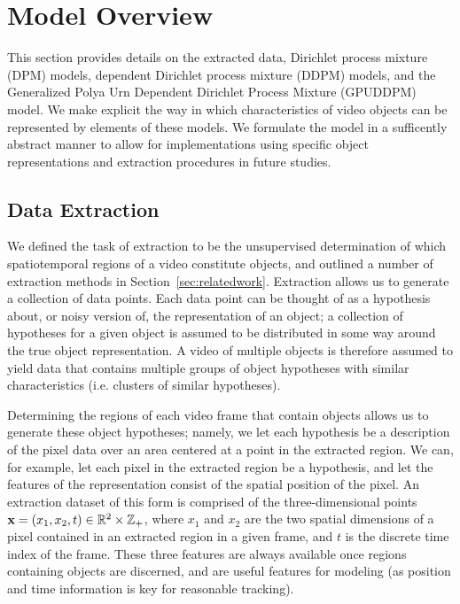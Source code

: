 \documentclass[smallcondensed, final]{svjour3}
\begin{document}

\section{Model Overview}
\label{sec:modeloverview}

This section provides details on the extracted data, Dirichlet process mixture (DPM) models, dependent Dirichlet process mixture (DDPM) models, and the Generalized Polya Urn Dependent Dirichlet Process Mixture (GPUDDPM) model. We make explicit the way in which characteristics of video objects can be represented by elements of these models. We formulate the model in a sufficently abstract manner to allow for implementations using specific object representations and extraction procedures in future studies.






\subsection{Data Extraction}
\label{sec:data}

We defined the task of extraction to be the unsupervised determination of which spatiotemporal regions of a video constitute objects, and outlined a number of extraction methods in Section~\ref{sec:relatedwork}. Extraction allows us to generate a collection of data points. Each data point can be thought of as a hypothesis about, or noisy version of, the representation of an object; a collection of hypotheses for a given object is assumed to be distributed in some way around the true object representation. A video of multiple objects is therefore assumed to yield data that contains multiple groups of object hypotheses with similar characteristics (i.e. clusters of similar hypotheses).

Determining the regions of each video frame that contain objects allows us to generate these object hypotheses; namely, we let each hypothesis be a description of the pixel data over an area centered at a point in the extracted region. We can, for example, let each pixel in the extracted region be a hypothesis, and let the features of the representation consist of the spatial position of the pixel. An extraction dataset of this form is comprised of the three-dimensional points $\bold{x} = ( x_{1}, x_{2}, t ) \in \mathbb{R}^{2} \times \mathbb{Z}_{+}$, where $x_{1}$ and $x_{2}$ are the two spatial dimensions of a pixel contained in an extracted region in a given frame, and $t$ is the discrete time index of the frame. These three features are always available once regions containing objects are discerned, and are useful features for modeling (as position and time information is key for reasonable tracking).
\end{document}
